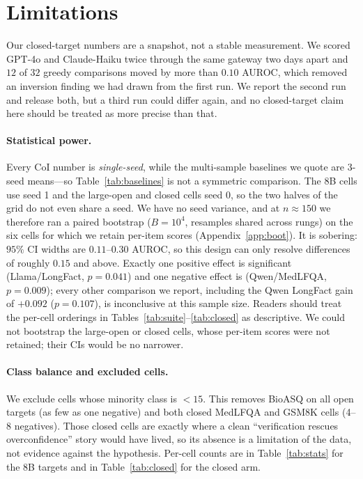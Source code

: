 \documentclass[11pt]{article}
\begin{document}
\section*{Limitations}
Our closed-target numbers are a snapshot, not a stable measurement. We scored GPT-4o and
Claude-Haiku twice through the same gateway two days apart and $12$ of $32$ greedy comparisons
moved by more than $0.10$ AUROC, which removed an inversion finding we had drawn from the first
run. We report the second run and release both, but a third run could differ again, and no
closed-target claim here should be treated as more precise than that.
\paragraph{Statistical power.} Every CoI number is \emph{single-seed}, while the multi-sample
baselines we quote are 3-seed means---so Table~\ref{tab:baselines} is not a symmetric
comparison. The 8B cells use seed 1 and the large-open and closed cells seed 0, so the two
halves of the grid do not even share a seed. We have no seed variance, and at $n{\approx}150$
we therefore ran a paired bootstrap ($B{=}10^4$, resamples shared across rungs) on the six
cells for which we retain per-item scores (Appendix~\ref{app:boot}). It is sobering: $95\%$ CI
widths are $0.11$--$0.30$ AUROC, so this design can only resolve differences of roughly $0.15$
and above. Exactly one positive effect is significant (Llama/LongFact, $p{=}0.041$) and one
negative effect is (Qwen/MedLFQA, $p{=}0.009$); every other comparison we report, including the
Qwen LongFact gain of $+0.092$ ($p{=}0.107$), is inconclusive at this sample size. Readers
should treat the per-cell orderings in Tables~\ref{tab:suite}--\ref{tab:closed} as descriptive.
We could not bootstrap the large-open or closed cells, whose per-item scores were not retained;
their CIs would be no narrower.

\paragraph{Class balance and excluded cells.} We exclude cells whose minority class is $<15$.
This removes BioASQ on all open targets (as few as one negative) and both closed MedLFQA and
GSM8K cells (4--8 negatives). Those closed cells are exactly where a clean
``verification rescues overconfidence'' story would have lived, so its absence is a limitation
of the data, not evidence against the hypothesis. Per-cell counts are in
Table~\ref{tab:stats} for the 8B targets and in Table~\ref{tab:closed} for the closed arm.
\end{document}
